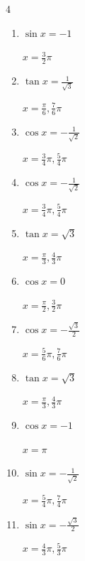 \newpage
\resetdrill

\begin{multicols}{4}
\begin{enumerate}
  \itemsep=2pt
  \item $\displaystyle \sin{x}  = -1$

        $\displaystyle x = \frac{3}{2}\pi$

  \item $\displaystyle \tan{x}  = \frac{1}{\sqrt{3}}$

        $\displaystyle x = \frac{\pi}{6} , \frac{7}{6}\pi$

  \item $\displaystyle \cos{x}  = -\frac{1}{\sqrt{2}}$

        $\displaystyle x = \frac{3}{4}\pi , \frac{5}{4}\pi$

  \item $\displaystyle \cos{x}  = -\frac{1}{\sqrt{2}}$

        $\displaystyle x = \frac{3}{4}\pi , \frac{5}{4}\pi$

  \item $\displaystyle \tan{x}  = \sqrt{3}$

        $\displaystyle x = \frac{\pi}{3} , \frac{4}{3}\pi$

  \item $\displaystyle \cos{x}  = 0$

        $\displaystyle x = \frac{\pi}{2} , \frac{3}{2}\pi$

  \item $\displaystyle \cos{x}  = -\frac{\sqrt{3}}{2}$

        $\displaystyle x = \frac{5}{6}\pi , \frac{7}{6}\pi$

  \item $\displaystyle \tan{x}  = \sqrt{3}$

        $\displaystyle x = \frac{\pi}{3} , \frac{4}{3}\pi$

  \item $\displaystyle \cos{x}  = -1$

        $\displaystyle x = \pi$

  \item $\displaystyle \sin{x}  = -\frac{1}{\sqrt{2}}$

        $\displaystyle x = \frac{5}{4}\pi , \frac{7}{4}\pi$

  \item $\displaystyle \sin{x}  = -\frac{\sqrt{3}}{2}$

        $\displaystyle x = \frac{4}{3}\pi , \frac{5}{3}\pi$


\end{enumerate}
\end{multicols}
